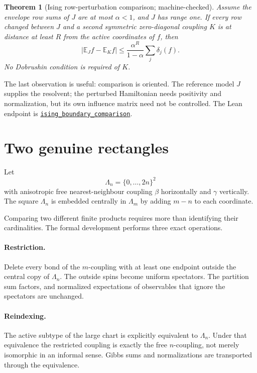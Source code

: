 \documentclass[11pt]{article}
\newtheorem{theorem}{Theorem}[section]
\theoremstyle{definition}
\newcommand{\E}{\mathbb E}
\newcommand{\abs}[1]{\lvert #1\rvert}
\newcommand{\sourceanchor}{f587b35001f4ae87c7fe0383662864df6bc9a1c0}
\newcommand{\leanline}[3]{%
  \href{https://github.com/lluiseriksson/THE-ERIKSSON-PROGRAMME/blob/\sourceanchor/YangMills/OS/#1.lean\#L#2}{\nolinkurl{#3}}}
\begin{document}
\begin{theorem}[Ising row-perturbation comparison; machine-checked]
\label{thm:ising-boundary}
Assume the envelope row sums of $J$ are at most $\alpha<1$, and $J$ has range
one.  If every row changed between $J$ and a second symmetric zero-diagonal
coupling $K$ is at distance at least $R$ from the active coordinates of $f$,
then
\[
  \abs{\E_J f-\E_K f}
  \le\frac{\alpha^R}{1-\alpha}\sum_j\delta_j(f).
\]
No Dobrushin condition is required of $K$.
\end{theorem}

The last observation is useful: comparison is oriented.  The reference model
$J$ supplies the resolvent; the perturbed Hamiltonian needs positivity and
normalization, but its own influence matrix need not be controlled.  The Lean
endpoint is
\leanline{DobrushinIsingComparison}{57}{ising_boundary_comparison}.

\section{Two genuine rectangles}

Let
\[
  \Lambda_n=\{0,\ldots,2n\}^2
\]
with anisotropic free nearest-neighbour coupling $\beta$ horizontally and
$\gamma$ vertically.  The square $\Lambda_n$ is embedded centrally in
$\Lambda_m$ by adding $m-n$ to each coordinate.

Comparing two different finite products requires more than identifying their
cardinalities.  The formal development performs three exact operations.

\paragraph{Restriction.}
Delete every bond of the $m$-coupling with at least one endpoint outside the
central copy of $\Lambda_n$.  The outside spins become uniform spectators.
The partition sum factors, and normalized expectations of observables that
ignore the spectators are unchanged.

\paragraph{Reindexing.}
The active subtype of the large chart is explicitly equivalent to
$\Lambda_n$.  Under that equivalence the restricted coupling is exactly the
free $n$-coupling, not merely isomorphic in an informal sense.  Gibbs sums and
normalizations are transported through the equivalence.
\end{document}
